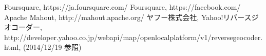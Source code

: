 \begin{thebibliography}{report}
 Foursquare, https://ja.foursquare.com/
 Foursquare, https://facebook.com/
 Apache Mahout, http://mahout.apache.org/
 ヤフー株式会社, Yahoo!リバースジオコーダー, \\ http://developer.yahoo.co.jp/webapi/map/openlocalplatform/v1/reversegeocoder.html, (2014/12/19 参照)
\end{thebibliography}
